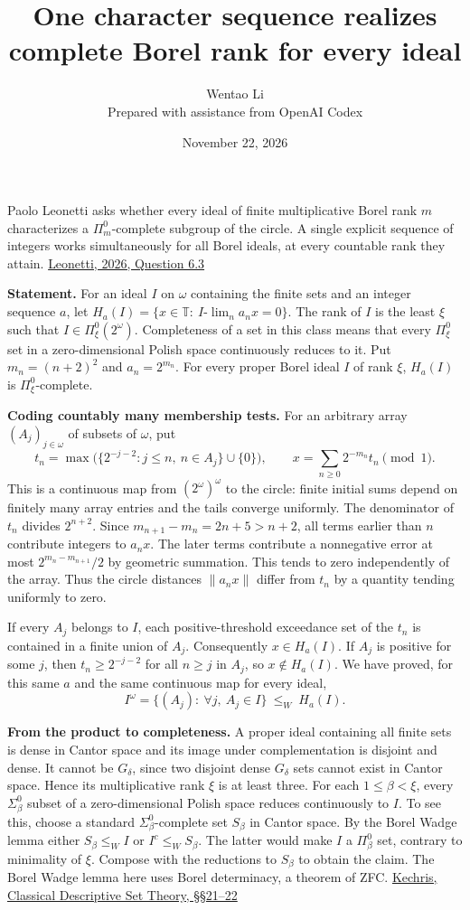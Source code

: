 \documentclass[11pt]{article}
\author{Wentao Li\\\small Prepared with assistance from OpenAI Codex}
\date{November 22, 2026}
\title{One character sequence realizes complete Borel rank for every ideal}
\begin{document}
\maketitle
Paolo Leonetti asks whether every ideal of finite multiplicative Borel rank \(m\) characterizes a \(\Pi^0_m\)-complete subgroup of the circle. A single explicit sequence of integers works simultaneously for all Borel ideals, at every countable rank they attain. \href{https://arxiv.org/abs/2608.23801}{Leonetti, 2026, Question 6.3}

\textbf{Statement.} For an ideal \(I\) on \(\omega\) containing the finite sets and an integer sequence \(a\), let \(H_a(I)=\{x\in\mathbb T:\ I\text{-}\lim_n a_nx=0\}\). The rank of \(I\) is the least \(\xi\) such that \(I\in\Pi^0_\xi(2^\omega)\). Completeness of a set in this class means that every \(\Pi^0_\xi\) set in a zero-dimensional Polish space continuously reduces to it. Put \(m_n=(n+2)^2\) and \(a_n=2^{m_n}\). For every proper Borel ideal \(I\) of rank \(\xi\), \(H_a(I)\) is \(\Pi^0_\xi\)-complete.

\textbf{Coding countably many membership tests.} For an arbitrary array \((A_j)_{j\in\omega}\) of subsets of \(\omega\), put \[ t_n=\max\big(\{2^{-j-2}:j\le n,\ n\in A_j\}\cup\{0\}\big),\qquad
 x=\sum_{n\ge0}2^{-m_n}t_n\pmod 1. \] This is a continuous map from \((2^\omega)^\omega\) to the circle: finite initial sums depend on finitely many array entries and the tails converge uniformly. The denominator of \(t_n\) divides \(2^{n+2}\). Since \(m_{n+1}-m_n=2n+5>n+2\), all terms earlier than \(n\) contribute integers to \(a_nx\). The later terms contribute a nonnegative error at most \(2^{m_n-m_{n+1}}/2\) by geometric summation. This tends to zero independently of the array. Thus the circle distances \(\|a_nx\|\) differ from \(t_n\) by a quantity tending uniformly to zero.

If every \(A_j\) belongs to \(I\), each positive-threshold exceedance set of the \(t_n\) is contained in a finite union of \(A_j\). Consequently \(x\in H_a(I)\). If \(A_j\) is positive for some \(j\), then \(t_n\ge2^{-j-2}\) for all \(n\ge j\) in \(A_j\), so \(x\notin H_a(I)\). We have proved, for this same \(a\) and the same continuous map for every ideal, \[ I^\omega=\{(A_j):\ \forall j,\ A_j\in I\}\ \le_W\ H_a(I). \]

\textbf{From the product to completeness.} A proper ideal containing all finite sets is dense in Cantor space and its image under complementation is disjoint and dense. It cannot be \(G_\delta\), since two disjoint dense \(G_\delta\) sets cannot exist in Cantor space. Hence its multiplicative rank \(\xi\) is at least three. For each \(1\le\beta<\xi\), every \(\Sigma^0_\beta\) subset of a zero-dimensional Polish space reduces continuously to \(I\). To see this, choose a standard \(\Sigma^0_\beta\)-complete set \(S_\beta\) in Cantor space. By the Borel Wadge lemma either \(S_\beta\le_W I\) or \(I^c\le_W S_\beta\). The latter would make \(I\) a \(\Pi^0_\beta\) set, contrary to minimality of \(\xi\). Compose with the reductions to \(S_\beta\) to obtain the claim. The Borel Wadge lemma here uses Borel determinacy, a theorem of ZFC. \href{https://doi.org/10.1007/978-1-4612-4190-4}{Kechris, Classical Descriptive Set Theory, §§21--22}
\end{document}
